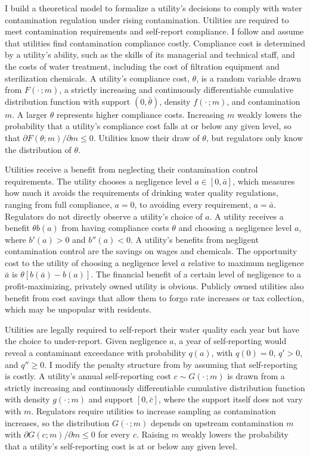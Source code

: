 \documentclass[12pt]{article}
\begin{document}
	I build a theoretical model to formalize a utility's decisions to comply with water contamination regulation under rising contamination. Utilities are required to meet contamination requirements and self-report compliance. I follow \textcite{mookherjee1994marginal} and assume that utilities find contamination compliance costly. Compliance cost is determined by a utility's ability, such as the skills of its managerial and technical staff, and the costs of water treatment, including the cost of filtration equipment and sterilization chemicals. A utility's compliance cost, $\theta$, is a random variable drawn from $F(\cdot\,;m)$, a strictly increasing and continuously differentiable cumulative distribution function with support $(0, \bar{\theta})$, density $f(\cdot\,;m)$, and contamination $m$. A larger $\theta$ represents higher compliance costs. Increasing $m$ weakly lowers the probability that a utility's compliance cost falls at or below any given level, so that $\partial F(\theta;m)/\partial m \le 0$. Utilities know their draw of $\theta$, but regulators only know the distribution of $\theta$. 

    Utilities receive a benefit from neglecting their contamination control requirements. The utility chooses a negligence level $a \in [0, \bar{a}]$, which measures how much it avoids the requirements of drinking water quality regulations, ranging from full compliance, $a=0$, to avoiding every requirement, $a=\bar{a}$. Regulators do not directly observe a utility's choice of $a$. A utility receives a benefit $\theta b(a)$ from having compliance costs $\theta$ and choosing a negligence level $a$, where $b'(a)>0$ and $b''(a)<0$. A utility's benefits from negligent contamination control are the savings on wages and chemicals. The opportunity cost to the utility of choosing a negligence level $a$ relative to maximum negligence $\bar{a}$ is $\theta[b(\bar{a})-b(a)]$. The financial benefit of a certain level of negligence to a profit-maximizing, privately owned utility is obvious. Publicly owned utilities also benefit from cost savings that allow them to forgo rate increases or tax collection, which may be unpopular with residents.
	
	Utilities are legally required to self-report their water quality each year but have the choice to under-report. Given negligence $a$, a year of self-reporting would reveal a contaminant exceedance with probability $q(a)$, with $q(0)=0$, $q'>0$, and $q'' \ge 0$. I modify the penalty structure from \textcite{kaplow1994optimal} by assuming that self-reporting is costly. A utility's annual self-reporting cost $c \sim G(\cdot\,;m)$ is drawn from a strictly increasing and continuously differentiable cumulative distribution function with density $g(\cdot\,;m)$ and support $[0,\bar{c}]$, where the support itself does not vary with $m$. Regulators require utilities to increase sampling as contamination increases, so the distribution $G(\cdot\,;m)$ depends on upstream contamination $m$ with $\partial G(c;m)/\partial m \le 0$ for every $c$. Raising $m$ weakly lowers the probability that a utility's self-reporting cost is at or below any given level. 
	
\end{document}
